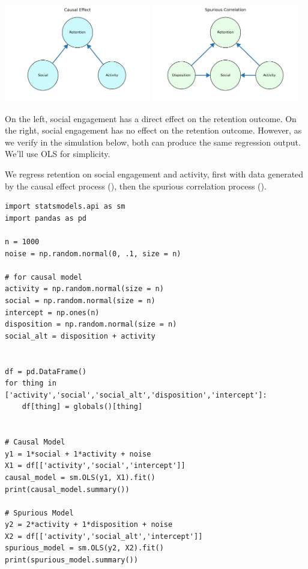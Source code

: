 \begin{center}
    
    \includegraphics[width =0.48\textwidth]{images/causal1.png} \includegraphics[width = 0.48\textwidth]{images/spurious.png}
\end{center}

On the left, social engagement has a direct effect on the retention outcome. On the right, social engagement has no effect on the retention outcome. However, as we verify in the simulation below, both can produce the same regression output. We'll use OLS for simplicity.  

We regress retention on social engagement and activity, first with data generated by the causal effect process (), then the spurious correlation process ().

\begin{lstlisting}
import statsmodels.api as sm
import pandas as pd

n = 1000
noise = np.random.normal(0, .1, size = n)

# for causal model
activity = np.random.normal(size = n)
social = np.random.normal(size = n)
intercept = np.ones(n)
disposition = np.random.normal(size = n)
social_alt = disposition + activity
    

df = pd.DataFrame()
for thing in ['activity','social','social_alt','disposition','intercept']:
    df[thing] = globals()[thing]


# Causal Model
y1 = 1*social + 1*activity + noise
X1 = df[['activity','social','intercept']]
causal_model = sm.OLS(y1, X1).fit()
print(causal_model.summary())

# Spurious Model
y2 = 2*activity + 1*disposition + noise
X2 = df[['activity','social_alt','intercept']]
spurious_model = sm.OLS(y2, X2).fit()
print(spurious_model.summary())
\end{lstlisting}

